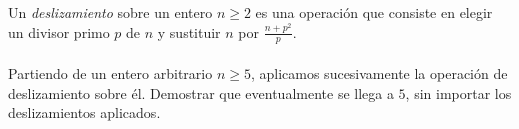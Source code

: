 Un \textit{deslizamiento} sobre un entero $n\geq 2$ es una operación que consiste en elegir un divisor primo $p$ de $n$ y sustituir $n$ por $\frac{n+p^2}{p}.$ \\\\
Partiendo de un entero arbitrario $n\geq 5$, aplicamos sucesivamente la operación de deslizamiento sobre él. Demostrar que eventualmente se llega a $5$, sin importar los deslizamientos aplicados.
